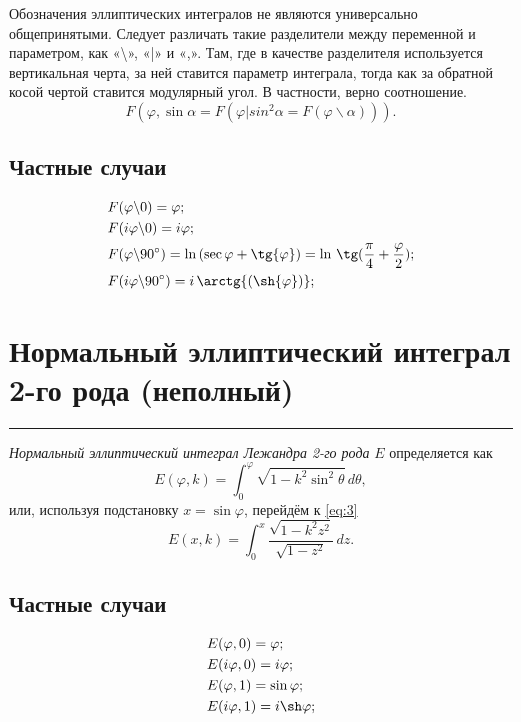 \documentclass[fleqn]{article}
\begin{document}
	Обозначения эллиптических интегралов не являются универсально общепринятыми. Следует различать такие разделители между переменной и параметром, как «\textbackslash», «|» и «,». Там, где в качестве разделителя используется вертикальная черта, за ней ставится параметр интеграла, тогда как за обратной косой чертой ставится модулярный угол. В частности, верно соотношение.
	\begin{equation*}F(\varphi, \sin{\alpha}=F(\varphi|sin^2{\alpha}=F(\varphi \backslash \alpha))).\end{equation*}
	\subsection{Частные случаи}
	\begin{align*}
		F&(\varphi \backslash 0)=\varphi; \\
		F&(i\varphi \backslash 0) = i\varphi; \\
		F&(\varphi \backslash 90^\circ) = \ln{(\sec{\varphi} + \tg{\varphi})}=\ln\,\tg(\frac{\pi}{4}+\frac{\varphi}{2}); \\
		F&(i\varphi \backslash 90^\circ) = i\,\arctg{(\sh{\varphi})};
	\end{align*}
	\section{Нормальный эллиптический интеграл 2-го рода (неполный)}
	\hrule
	\emph{Нормальный эллиптический интеграл Лежандра 2-го рода} $E$ определяется как
	\begin{equation*}E(\varphi, k)=\int_0^\varphi \sqrt{1-k^2\sin^2 \theta}\, d\theta,\end{equation*}
	или, используя подстановку $x = \sin \varphi$, перейдём к \eqref{eq:3}
	\begin{equation*}E(x, k)=\int_0^x\frac{\sqrt{1-k^2z^2}}{\sqrt{1-z^2}}\, dz.\end{equation*}
	\subsection{Частные случаи}
	\begin{align}
		E&(\varphi, 0) = \varphi; \label{eq:3}\\
		E&(i\varphi, 0) = i\varphi; \nonumber\\
		E&(\varphi, 1) = \sin \varphi; \nonumber\\
		E&(i\varphi, 1) = i \sh \varphi; \nonumber
	\end{align}
\end{document}
